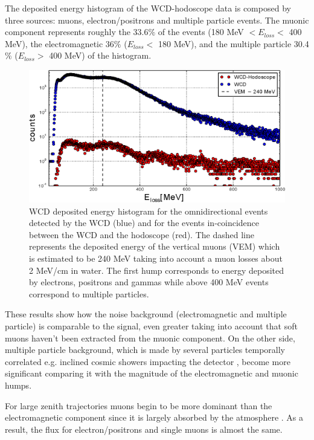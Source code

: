 \documentclass[letterpaper,11pt]{article}
\begin{document}
The deposited energy histogram of the WCD-hodoscope data is composed by three sources: muons, electron/positrons and multiple particle events. The muonic component represents roughly the 33.6$\%$ of the events (180 MeV $< E_{loss} <$ 400 MeV), the electromagnetic 36$\%$ ($E_{loss} <$ 180 MeV), and the multiple particle 30.4$\%$ ($E_{loss} >$ 400 MeV) of the histogram. 

\begin{figure}[htb]
\centering
\includegraphics[width=0.7\columnwidth]{Figures/WCDHod.eps}
\caption{WCD deposited energy histogram for the omnidirectional events detected by the WCD (blue) and for the events in-coincidence between the WCD and the hodoscope (red). The dashed line represents the deposited energy of the vertical muons (VEM) which is estimated to be 240 MeV taking into account a muon losses about 2 MeV/cm in water. The first hump corresponds to energy deposited by electrons, positrons and gammas while above 400 MeV events correspond to multiple particles.}
\label{fig:WCDHod_rate}
\end{figure}

These results show how the noise background (electromagnetic and multiple particle) is comparable to the signal, even greater taking into account that soft muons haven't been extracted from the muonic component. On the other side, multiple particle background, which is made by several particles temporally correlated e.g. inclined cosmic showers impacting the detector \cite{Bonechi2019}, become more significant comparing it with the magnitude of the electromagnetic and muonic humps.

For large zenith trajectories muons begin to be more dominant than the electromagnetic component since it is largely absorbed by the atmosphere \cite{collaboration2014}. As a result, the flux for electron/positrons and single muons is almost the same.
\end{document}
